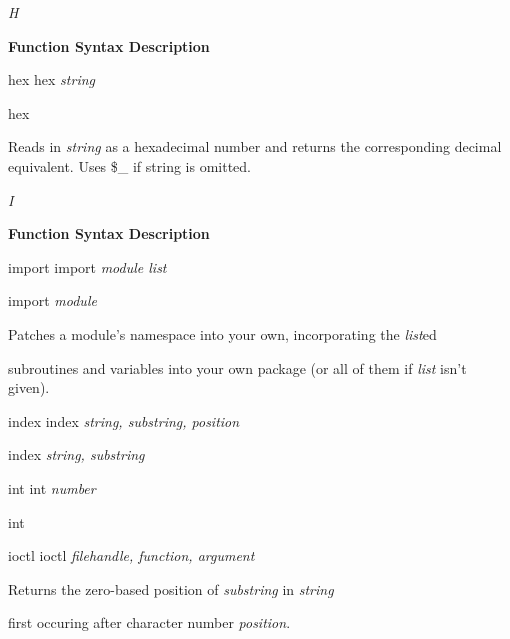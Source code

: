 \documentclass[a4paper,11pt]{book}
\begin{document}
\noindent 

\noindent \textit{H}

\noindent 

\noindent \textbf{Function Syntax Description}

\noindent 

\noindent hex hex \textit{string}

\noindent 

\noindent hex

\noindent 

\noindent Reads in \textit{string }as a hexadecimal number and returns the corresponding decimal equivalent. Uses \$\_ if string is omitted.

\noindent 

\noindent 

\noindent \textit{I}

\noindent 

\noindent \textbf{Function Syntax Description}

\noindent 

\noindent import import \textit{module list}

\noindent 

\noindent import \textit{module}

\noindent 

\noindent Patches a module's namespace into your own, incorporating the \textit{list}ed

\noindent subroutines and variables into your own package (or all of them if \textit{list }isn't given).

\noindent 

\noindent 

\noindent index index \textit{string, substring, position}

\noindent 

\noindent index \textit{string, substring}

\noindent 

\noindent int int \textit{number}

\noindent 

\noindent int

\noindent 

\noindent ioctl ioctl \textit{filehandle, function, argument}

\noindent 

\noindent Returns the zero-based position of \textit{substring }in \textit{string}

\noindent first occuring after character number \textit{position}.
\end{document}
